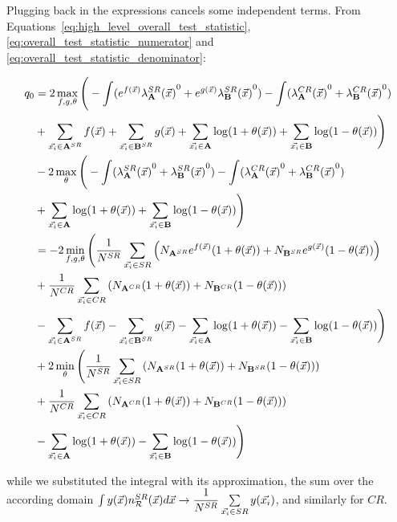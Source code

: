\documentclass[../../ddppaper2.tex]{subfiles}
\begin{document}
Plugging back in the expressions cancels some independent terms. From Equations~\ref{eq:high_level_overall_test_statistic}, \ref{eq:overall_test_statistic_numerator} and \ref{eq:overall_test_statistic_denominator}:

\begin{equation}
\begin{aligned}
{q_{0}} &= 2 \max\limits_{f, g, {\theta}} \Bigg(
    - \int (e^{f(\vec{{x}})}{{\lambda}_{{\mathbf{A}}}^{SR}(\vec{{x}})}^0 + e^{g(\vec{{x}})}{{\lambda}_{{\mathbf{B}}}^{SR}(\vec{{x}})}^0)
    - \int ({{\lambda}_{{\mathbf{A}}}^{CR}(\vec{{x}})}^0 + {{\lambda}_{{\mathbf{B}}}^{CR}(\vec{{x}})}^0)
    \\&
    + \sum\limits_{{\vec{{x}_i}} \in {{\mathbf{A}}^{SR}}} f(\vec{{x}})
    + \sum\limits_{{\vec{{x}_i}} \in {{\mathbf{B}}^{SR}}} g(\vec{{x}})
    + \sum\limits_{{\vec{{x}_i}} \in {\mathbf{A}}} \log(1 + {{\theta}(\vec{{x}})})
    + \sum\limits_{{\vec{{x}_i}} \in {\mathbf{B}}} \log(1 - {{\theta}(\vec{{x}})})
\Bigg)
\\&
- 2 \max\limits_{{\theta}} \Bigg(
    - \int ({{\lambda}_{{\mathbf{A}}}^{SR}(\vec{{x}})}^0 + {{\lambda}_{{\mathbf{B}}}^{SR}(\vec{{x}})}^0)
    - \int ({{\lambda}_{{\mathbf{A}}}^{CR}(\vec{{x}})}^0 + {{\lambda}_{{\mathbf{B}}}^{CR}(\vec{{x}})}^0)
    \\&
    + \sum\limits_{{\vec{{x}_i}} \in {\mathbf{A}}} \log(1 + {{\theta}(\vec{{x}})})
    + \sum\limits_{{\vec{{x}_i}} \in {\mathbf{B}}} \log(1 - {{\theta}(\vec{{x}})})
\Bigg) \\
&= - 2 \min\limits_{f, g, {\theta}} \Bigg(
    \dfrac{1}{N^{SR}} \sum\limits_{{\vec{{x}_i}} \in SR} \left(
        N_{{\mathbf{A}}^{SR}} e^{f(\vec{{x}})} (1 + {{\theta}(\vec{{x}})})
        + N_{{\mathbf{B}}^{SR}}e^{g(\vec{{x}})} (1 - {{\theta}(\vec{{x}})})
    \right)
    \\&
    + \dfrac{1}{N^{CR}} \sum\limits_{{\vec{{x}_i}} \in CR} \left(
        N_{{\mathbf{A}}^{CR}} (1 + {{\theta}(\vec{{x}})})
        + N_{{\mathbf{B}}^{CR}} (1 - {{\theta}(\vec{{x}})})
    \right)
    \\&
    - \sum\limits_{{\vec{{x}_i}} \in {{\mathbf{A}}^{SR}}} f(\vec{{x}})
    - \sum\limits_{{\vec{{x}_i}} \in {{\mathbf{B}}^{SR}}} g(\vec{{x}})
    - \sum\limits_{{\vec{{x}_i}} \in {\mathbf{A}}} \log(1 + {{\theta}(\vec{{x}})})
    - \sum\limits_{{\vec{{x}_i}} \in {\mathbf{B}}} \log(1 - {{\theta}(\vec{{x}})})
\Bigg)
\\&
+ 2 \min\limits_{{\theta}} \Bigg(
    \dfrac{1}{N^{SR}} \sum\limits_{{\vec{{x}_i}} \in SR} \left(
        N_{{\mathbf{A}}^{SR}} (1 + {{\theta}(\vec{{x}})})
        + N_{{\mathbf{B}}^{SR}}(1 - {{\theta}(\vec{{x}})})
    \right) \\&
    + \dfrac{1}{N^{CR}} \sum\limits_{{\vec{{x}_i}} \in CR} \left(
        N_{{\mathbf{A}}^{CR}} (1 + {{\theta}(\vec{{x}})})
        + N_{{\mathbf{B}}^{CR}}(1 - {{\theta}(\vec{{x}})})
    \right)
    \\&
    - \sum\limits_{{\vec{{x}_i}} \in {\mathbf{A}}} \log(1 + {{\theta}(\vec{{x}})})
    - \sum\limits_{{\vec{{x}_i}} \in {\mathbf{B}}} \log(1 - {{\theta}(\vec{{x}})})
\Bigg)
\end{aligned}
\end{equation}

\noindent while we substituted the integral with its approximation, the sum over the according domain $\int y(\vec{{x}}) n_{\mathcal{R}}^{SR}({\vec{{x}}}) d\vec{{x}} \to \dfrac{1}{N^{SR}} \sum\limits_{{\vec{{x}_i}} \in SR} y({\vec{{x}_i}})$, and similarly for $CR$.
\end{document}
